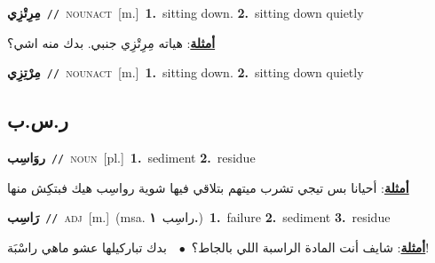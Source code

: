 \documentclass[10pt,a4paper,twoside]{article} %
\begin{document}
\begin{multicols}{2}
{\setlength\topsep{0pt}\textbf{\foreignlanguage{arabic}{مِرِتْزِي}}\ {\color{gray}\texttt{//}\color{black}}\ \textsc{noun\textunderscore act}\ [m.]\ \textbf{1.}~sitting down.  \textbf{2.}~sitting down quietly\  \begin{flushright}\color{gray}\foreignlanguage{arabic}{\textbf{\underline{\foreignlanguage{arabic}{أمثلة}}}: هياته مِرِتْزِي جنبي. بدك منه اشي؟}\end{flushright}\color{black}} \vspace{2mm}

{\setlength\topsep{0pt}\textbf{\foreignlanguage{arabic}{مِرْتِزِي}}\ {\color{gray}\texttt{//}\color{black}}\ \textsc{noun\textunderscore act}\ [m.]\ \textbf{1.}~sitting down.  \textbf{2.}~sitting down quietly\ } \vspace{2mm}

\vspace{-3mm}
\subsection*{\color{blue}\foreignlanguage{arabic}{ر.س.ب}\color{blue}{}} 

{\setlength\topsep{0pt}\textbf{\foreignlanguage{arabic}{روَاسِب}}\ {\color{gray}\texttt{//}\color{black}}\ \textsc{noun}\ [pl.]\ \textbf{1.}~sediment  \textbf{2.}~residue\  \begin{flushright}\color{gray}\foreignlanguage{arabic}{\textbf{\underline{\foreignlanguage{arabic}{أمثلة}}}: أحيانا بس تيجي تشرب ميتهم بتلاقي فيها شوية رواسِب هيك فبتكِش منها}\end{flushright}\color{black}} \vspace{2mm}

{\setlength\topsep{0pt}\textbf{\foreignlanguage{arabic}{رَاسِب}}\ {\color{gray}\texttt{//}\color{black}}\ \textsc{adj}\ [m.]\ \color{gray}(msa. \foreignlanguage{arabic}{راسِب}~\foreignlanguage{arabic}{\textbf{١.}})\color{black}\ \textbf{1.}~failure  \textbf{2.}~sediment  \textbf{3.}~residue\  \begin{flushright}\color{gray}\foreignlanguage{arabic}{\textbf{\underline{\foreignlanguage{arabic}{أمثلة}}}: شايف أنت المادة الراسبة اللي بالجاط؟\ $\bullet$\ \  بدك تباركيلها عشو ماهي راسْبَة!}\end{flushright}\color{black}} \vspace{2mm}


\end{multicols}
\end{document}

